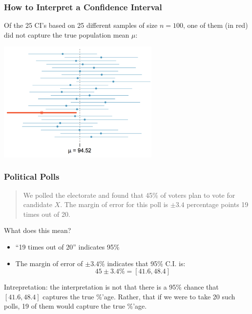 \documentclass[handout]{beamer}
\newcommand{\blue}[1]{\textcolor{blue2}{#1}}
\begin{document}
\begin{frame}
\frametitle{How to Interpret a Confidence Interval}
Of the 25 CI's based on 25 different samples of size $n=100$, one of them (in red) did not capture the true population mean $\mu$:

\begin{center}
\includegraphics[width=8cm]{figure/CI.png}
\end{center}

\end{frame}


\begin{frame}
\frametitle{Political Polls}
\begin{quotation}
\noindent We polled the electorate and found that 45\% of voters plan to vote for candidate $X$.  The margin of error for this poll is $\pm 3.4$ percentage points 19 times out of 20.  
\end{quotation}
\pause What does this mean?
\begin{itemize}
\item ``19 times out of 20'' indicates 95\%
\item The margin of error of $\pm 3.4$\% indicates that 95\% C.I. is:
\[45 \pm 3.4 \% = [41.6, 48.4]\]
\end{itemize}
\pause \blue{Intrepretation}: the interpretation is not that there is a 95\% chance that $[41.6, 48.4]$ captures the true \%'age.  Rather, that if we were to take 20 such polls, 19 of them would capture the true \%'age.
\end{frame}
\end{document}
